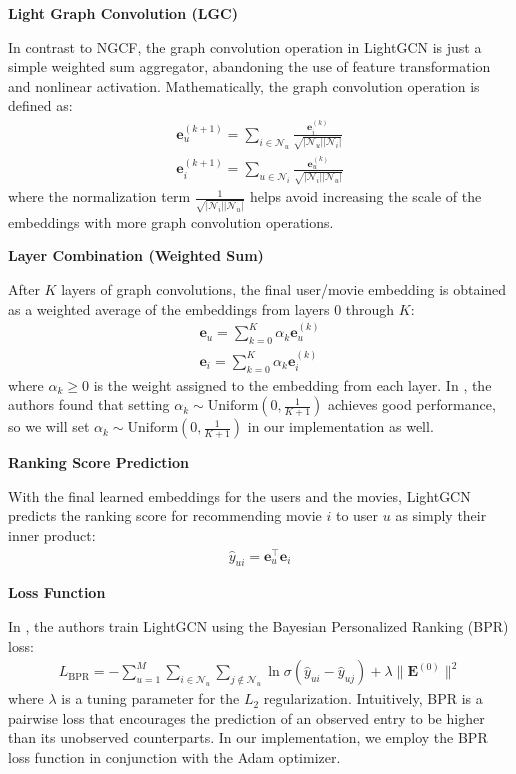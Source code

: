 \documentclass{article}
\begin{document}
\textbf{Light Graph Convolution (LGC)}

In contrast to NGCF, the graph convolution operation in LightGCN is just a simple weighted sum aggregator, abandoning the use of feature transformation and nonlinear activation. Mathematically, the graph convolution operation is defined as:
\begin{align*}
    \mathbf{e}_u^{(k+1)} = \sum_{i \in \mathcal{N}_u} \frac{\mathbf{e}_i^{(k)}}{\sqrt{| \mathcal{N}_u | | \mathcal{N}_i | }} \\
    \mathbf{e}_i^{(k+1)} = \sum_{u \in \mathcal{N}_i} \frac{\mathbf{e}_u^{(k)}}{\sqrt{| \mathcal{N}_i | | \mathcal{N}_u | }}
\end{align*}
where the normalization term $\frac{1}{\sqrt{|\mathcal{N}_i| |\mathcal{N}_u|}}$ helps avoid increasing the scale of the embeddings with more graph convolution operations. \cite{lightgcn}

\textbf{Layer Combination (Weighted Sum)}

After $K$ layers of graph convolutions, the final user/movie embedding is obtained as a weighted average of the embeddings from layers $0$ through $K$:
\begin{align*}
    \mathbf{e}_u = \sum_{k = 0}^K \alpha_k \mathbf{e}_u^{(k)} \\
    \mathbf{e}_i = \sum_{k = 0}^K \alpha_k \mathbf{e}_i^{(k)}
\end{align*}
where $\alpha_k \geq 0$ is the weight assigned to the embedding from each layer. In \cite{lightgcn}, the authors found that setting $\alpha_k \sim \mbox{Uniform}(0, \frac{1}{K + 1})$ achieves good performance, so we will set $\alpha_k \sim \mbox{Uniform}(0, \frac{1}{K+1})$ in our implementation as well.

\textbf{Ranking Score Prediction}

With the final learned embeddings for the users and the movies, LightGCN predicts the ranking score \cite{lightgcn} for recommending movie $i$ to user $u$ as simply their inner product:
\begin{align*}
    \hat{y}_{ui} = \mathbf{e}_u^\top \mathbf{e}_i
\end{align*}

\textbf{Loss Function}

In \cite{lightgcn}, the authors train LightGCN using the Bayesian Personalized Ranking (BPR) loss:
\begin{align*}
    L_{\mbox{BPR}} = - \sum_{u = 1}^M \sum_{i \in \mathcal{N}_u} \sum_{j \notin \mathcal{N}_u} \ln \sigma(\hat{y}_{ui} - \hat{y}_{uj}) + \lambda \| \mathbf{E}^{(0)} \|^2
\end{align*}
where $\lambda$ is a tuning parameter for the $L_2$ regularization. Intuitively, BPR is a pairwise loss that encourages the prediction of an observed entry to be higher than its unobserved counterparts. In our implementation, we employ the BPR loss function in conjunction with the Adam \cite{adam} optimizer.
\end{document}
